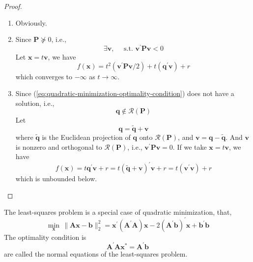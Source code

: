 \begin{proof}
	\hfill
	\begin{enumerate}
		\item
		      Obviously.

		\item
		      Since $\mathbf{P}\nsucceq 0$, i.e.,
		      \begin{equation*}
			      \exists\mathbf{v},\quad\text{ s.t. }\mathbf{v}^{\prime}\mathbf{P}\mathbf{v}<0
		      \end{equation*}
		      Let $\mathbf{x}=t\mathbf{v}$, we have
		      \begin{equation*}
			      f\left(\mathbf{x}\right)=t^{2}\left(\mathbf{v}^{\prime}\mathbf{P}\mathbf{v}/2\right)+t\left(\mathbf{q}^{\prime}\mathbf{v}\right)+r
		      \end{equation*}
		      which converges to $-\infty$ as $t\rightarrow\infty$.

		\item
		      Since (\ref{eq:quadratic-minimization-optimality-condition}) does not have a solution, i.e.,
		      \begin{equation*}
			      \mathbf{q}\notin\mathcal{R}(\mathbf{P})
		      \end{equation*}
		      Let
		      \begin{equation*}
			      \mathbf{q}=\tilde{\mathbf{q}}+\mathbf{v}
		      \end{equation*}
		      where $\tilde{\mathbf{q}}$ is the Euclidean projection of $\mathbf{q}$ onto $\mathcal{R}(\mathbf{P})$, and $\mathbf{v}=\mathbf{q}-\tilde{\mathbf{q}}$. And $\mathbf{v}$ is nonzero and orthogonal to $\mathcal{R}(\mathbf{P})$, i.e., $\mathbf{v}^{\prime}\mathbf{P}\mathbf{v}=0$. If we take $\mathbf{x}=t\mathbf{v}$, we have
		      \begin{equation*}
			      f(\mathbf{x})=t\mathbf{q}^{\prime}\mathbf{v}+r=t(\tilde{\mathbf{q}}+\mathbf{v})^{\prime}\mathbf{v}+r=t(\mathbf{v}^{\prime}\mathbf{v})+r
		      \end{equation*}
		      which is unbounded below.
	\end{enumerate}
\end{proof}

\begin{remark}
	The least-squares problem is a special case of quadratic minimization, that,
	\begin{equation*}
		\min_{\mathbf{x}}\,\|\mathbf{A}\mathbf{x}-\mathbf{b}\|_{2}^{2}=\mathbf{x}^{\prime}\left(\mathbf{A}^{\prime}\mathbf{A}\right)\mathbf{x}-2\left(\mathbf{A}^{\prime}\mathbf{b}\right)^{\prime}\mathbf{x}+\mathbf{b}^{\prime}\mathbf{b}
	\end{equation*}
	The optimality condition is
	\begin{equation*}
		\mathbf{A}^{\prime}\mathbf{A}\mathbf{x}^{*}=\mathbf{A}^{\prime}\mathbf{b}
	\end{equation*}
	are called the normal equations of the least-squares problem.
\end{remark}

